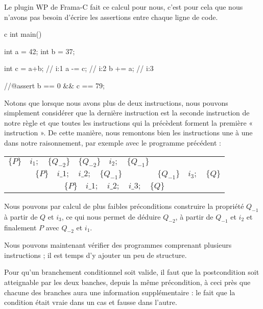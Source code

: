 Le plugin WP de Frama-C fait ce calcul pour nous, c'est pour cela que nous
n'avons pas besoin d'écrire les assertions entre chaque ligne de code.



\begin{CodeBlock}{c}
int main(){
  int a = 42;
  int b = 37;

  int c = a+b; // i:1
  a -= c;      // i:2
  b += a;      // i:3

  //@assert b == 0 && c == 79;
}
\end{CodeBlock}





Notons que lorsque nous avons plus de deux instructions, nous pouvons simplement
considérer que la dernière instruction est la seconde instruction de notre règle
et que toutes les instructions qui la précèdent forment la première « instruction ».
De cette manière, nous remontons bien les instructions une à une dans notre
raisonnement, par exemple avec le programme précédent :


\begin{center}
\begin{tabular}{ccc}
  $\{P\}\quad i_1 ; \quad \{Q_{-2}\}$ & $\{Q_{-2}\}\quad i_2 ; \quad \{Q_{-1}\}$ & \\
  \cline{1-2}
  \multicolumn{2}{c}{$\{P\}\quad i\_1 ; \quad i\_2 ; \quad \{Q_{-1}\}$} & $\{Q_{-1}\} \quad i_3 ; \quad \{Q\}$\\
  \hline
  \multicolumn{3}{c}{$\{P\}\quad i\_1 ; \quad i\_2 ; \quad i\_3; \quad \{ Q \}$}
\end{tabular}
\end{center}

Nous pouvons par calcul de plus faibles préconditions construire la propriété
$Q_{-1}$ à partir de $Q$ et $i_3$, ce qui nous permet de déduire $Q_{-2}$, à
partir de $Q_{-1}$ et $i_2$ et finalement $P$ avec $Q_{-2}$ et $i_1$.



Nous pouvons maintenant vérifier des programmes comprenant plusieurs
instructions ; il est temps d'y ajouter un peu de structure.





Pour qu'un branchement conditionnel soit valide, il faut que la postcondition
soit atteignable par les deux banches, depuis la même précondition, à ceci
près que chacune des branches aura une information supplémentaire : le fait
que la condition était vraie dans un cas et fausse dans l'autre.



